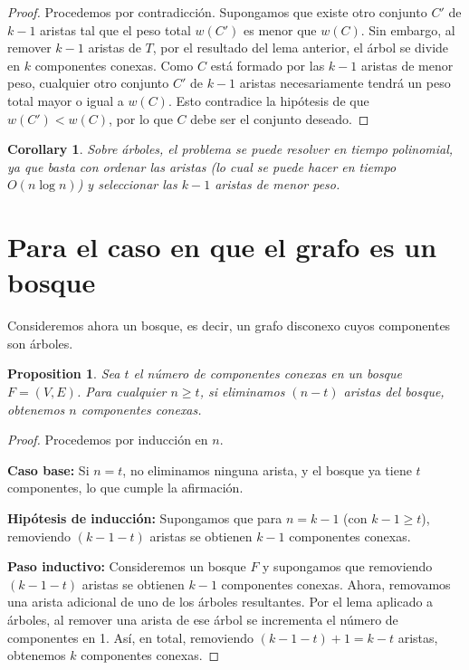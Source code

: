 \documentclass[12pt]{article}
\newtheorem{proposition}{Proposition}
\newtheorem{corollary}{Corollary}
\begin{document}
\begin{proof}
Procedemos por contradicción. Supongamos que existe otro conjunto \( C' \) de \( k-1 \) aristas tal que el peso total \( w(C') \) es menor que \( w(C) \).  
Sin embargo, al remover \( k-1 \) aristas de \( T \), por el resultado del lema anterior, el árbol se divide en \( k \) componentes conexas.  
Como \( C \) está formado por las \( k-1 \) aristas de menor peso, cualquier otro conjunto \( C' \) de \( k-1 \) aristas necesariamente tendrá un peso total mayor o igual a \( w(C) \).  
Esto contradice la hipótesis de que \( w(C') < w(C) \), por lo que \( C \) debe ser el conjunto deseado.
\end{proof}

\begin{corollary}
Sobre árboles, el problema se puede resolver en tiempo polinomial, ya que basta con ordenar las aristas (lo cual se puede hacer en tiempo \( O(n \log n) \)) y seleccionar las \( k-1 \) aristas de menor peso.
\end{corollary}

\section{Para el caso en que el grafo es un bosque}

Consideremos ahora un bosque, es decir, un grafo disconexo cuyos componentes son árboles.

\begin{proposition}
Sea \( t \) el número de componentes conexas en un bosque \( F = (V, E) \). Para cualquier \( n \ge t \), si eliminamos \( (n-t) \) aristas del bosque, obtenemos \( n \) componentes conexas.
\end{proposition}

\begin{proof}
Procedemos por inducción en \( n \).

\textbf{Caso base:}  
Si \( n = t \), no eliminamos ninguna arista, y el bosque ya tiene \( t \) componentes, lo que cumple la afirmación.

\textbf{Hipótesis de inducción:}  
Supongamos que para \( n = k-1 \) (con \( k-1 \ge t \)), removiendo \( (k-1 - t) \) aristas se obtienen \( k-1 \) componentes conexas.

\textbf{Paso inductivo:}  
Consideremos un bosque \( F \) y supongamos que removiendo \( (k-1-t) \) aristas se obtienen \( k-1 \) componentes conexas.  
Ahora, removamos una arista adicional de uno de los árboles resultantes. Por el lema aplicado a árboles, al remover una arista de ese árbol se incrementa el número de componentes en 1.  
Así, en total, removiendo \( (k-1-t) + 1 = k-t \) aristas, obtenemos \( k \) componentes conexas.  
\end{proof}
\end{document}
